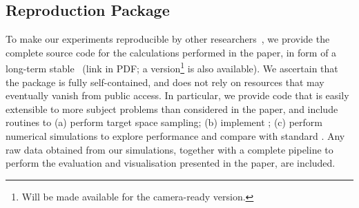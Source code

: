 \begin{appendix}
\section{Reproduction Package}\label{sec:repro} 
    
To make our experiments reproducible by other researchers~\cite{reprobook:2019}, we provide the complete source 
code for the calculations performed in the paper, in form of a long-term 
stable~\cite{Mauerer:2022} \repro (link in PDF; a
\doirepro version\footnote{Will be made 
available for the camera-ready version.} 
is also available). We ascertain that the package is fully
self-contained, and does not rely on resources that may eventually 
vanish from public access. In particular, we provide code that is
easily extensible to more subject problems than considered
in the paper, and include routines to (a) perform target space 
sampling; (b) implement \ourQAOA; (c) perform numerical simulations 
to explore performance and compare with standard \QAOA.
Any raw data obtained from our simulations, together
with a complete pipeline to perform the evaluation and visualisation
presented in the paper, are included.
\end{appendix}
